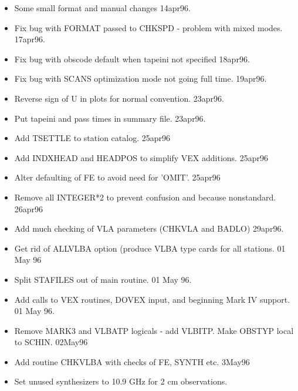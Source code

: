 \documentclass{report}
\begin{document}
\begin{itemize}

\item  Some small format and manual changes 14apr96.

\item  Fix bug with FORMAT passed to CHKSPD - problem with mixed modes.
17apr96.

\item  Fix bug with obscode default when tapeini not specified 18apr96.

\item Fix bug with SCANS optimization mode not going full
time. 19apr96.

\item Reverse sign of U in plots for normal convention. 23apr96.

\item Put tapeini and pass times in summary file. 23apr96.

\item Add TSETTLE to station catalog. 25apr96

\item Add INDXHEAD and HEADPOS to simplify VEX additions. 25apr96

\item Alter defaulting of FE to avoid need for 'OMIT'. 25apr96

\item Remove all INTEGER*2 to prevent confusion and because nonstandard.
      26apr96

\item Add much checking of VLA parameters (CHKVLA and BADLO) 29apr96.

\item Get rid of ALLVLBA option (produce VLBA type cards for all
      stations.  01 May 96

\item Split STAFILES out of main routine.  01 May 96.

\item Add calls to VEX routines, DOVEX input, and beginning Mark IV
      support.  01 May 96.

\item Remove MARK3 and VLBATP logicals - add VLBITP.  Make OBSTYP
      local to SCHIN.  02May96

\item Add routine CHKVLBA with checks of FE, SYNTH etc. 3May96

\item Set unused synthesizers to 10.9 GHz for 2 cm observations.


\end{itemize}
\end{document}
